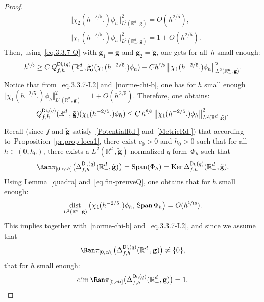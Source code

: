 \documentclass[JEP,XML,SOM,Unicode,NoEqCountersInSection,NoFloatCountersInSection,published]{cedram}
\DeclareMathOperator{\dist}{dist}
\DeclareMathOperator{\Span}{Span}
\newcommand{\mbf}[1]{\mathbf{#1}}
\DeclareMathOperator\Ker{Ker}
\theoremstyle{plain}
\theoremstyle{definition}
\begin{document}
\begin{proof}
\begin{equation}
\begin{aligned}
&\big\Vert \chi_2(h^{-2/5 }.) \phi_h\big \Vert_{L^2(\mathbb R^d_-,\mbf g)}^2 =O (h^{2/5 }), \\
& \big\Vert \chi_1(h^{-2/5
}.) \phi_h\big\Vert_{L^2(\mathbb R^d_-,\mbf g)}^2=1+O (h^{2/5 }).
\end{aligned}
\end{equation}
Then, using~\eqref{eq.3.3.7-Q} with $\mbf g_1=\mbf g$ and $\mbf g_2=\tilde{\mbf g}$, one gets for all~$h$ small enough:\vspace*{-3pt}
\[
h^{\sfrac 65} \ge C\, Q_{f,h}^{\mathsf{Di},(q)}(\mathbb R^d_-,\tilde{\mbf g})(\chi_1(h^{-2/5 }.)\phi_h)- Ch^{\sfrac 75}\, \big \Vert \chi_1(h^{-2/5 }.)\phi_h\big \Vert_{L^2(\mathbb R^d_-,\tilde{\mbf g})}^2.
\]
Notice that from~\eqref{eq.3.3.7-L2} and~\eqref{norme-chi-b}, one has
for $h$ small enough
$ \Vert \chi_1(h^{-2/5 }.)\phi_h\big \Vert_{L^2(\mathbb R^d_-,\tilde{\mbf g})}^2=1+O(h^{2/5 })$.
Therefore, one obtains:\vspace*{-3pt}
\begin{align}\label{eq.fin-preuveQ}
Q_{f,h}^{\mathsf{Di},(q)}(\mathbb R^d_-,\tilde{\mbf g})(\chi_1(h^{-2/5 }.)\phi_h) \le C \, h^{\sfrac 65} \, \big \Vert \chi_1(h^{-2/5 }.)\phi_h\big \Vert_{L^2(\mathbb R^d_-,\tilde{\mbf g})}^2.
\end{align}
Recall (since $f$ and $\tilde{\mbf g}$ satisfy~\ref{PotentialRd-} and~\ref{MetricRd-}) that according to~Proposition~\ref{pr.prop-loca1}, there exist $c_0>0$ and $h_0>0$ such that for all $h\in (0,h_0)$, there exists a $L^2(\mathbb R^d_-,\tilde{\mbf g})$-normalized $q$-form~$\Phi_h$ such that
\begin{equation}\label{eq.PHIH}
\Ran \pi_{[0,c_0h]}\bigl(\Delta_{f,h}^{\mathsf{Di},(q)}(\mathbb R_-^d,\tilde{\mbf g})\bigr)=\Span (\Phi_h)=\Ker \Delta_{f,h}^{\mathsf{Di},(q)}(\mathbb R_-^d,\tilde{\mbf g}).
\end{equation}
Using Lemma~\ref{quadra} and~\eqref{eq.fin-preuveQ}, one obtains that for $h$ small enough:
\begin{align*}
\dist_{L^2(\mathbb R_-^d,\tilde{\mbf g})}\, \bigl(\chi_1(h^{-2/5 }.)\phi_h,\, \Span \Phi_h \bigr)= O(h^{\sfrac{1}{10}}).
\end{align*}
This implies together with~\eqref{norme-chi-b}
and~\eqref{eq.3.3.7-L2}, and since we assume that
\[
\Ran \pi_{[0,ch]}\bigl(\Delta_{f,h}^{\mathsf{Di},(q)}(\mathbb R_-^d, \mbf g) \bigr)\neq \{0\},
\]
that for $h$ small enough:
\[
\dim \Ran \pi_{[0,ch]}\bigl(\Delta_{f,h}^{\mathsf{Di},(q)}(\mathbb R^d_-,\mbf g)\bigr)= 1.
\]


\end{proof}
\end{document}
